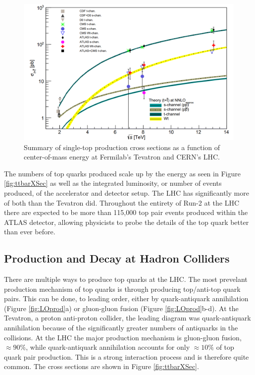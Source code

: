\begin{figure}[h!]
	\centering
	\includegraphics[width=\columnwidth]{../ThesisImages/Theory/singtprodxsec.png}
	\caption[Summary of single-top production cross sections as a function of center-of-mass energy at Fermilab's Tevatron and CERN's LHC.]{Summary of single-top production cross sections as a function of center-of-mass energy at Fermilab's Tevatron and CERN's LHC\cite{TopWG}.}
	\label{fig:singtXSec}
\end{figure}

 The numbers of top quarks produced scale up by the energy as seen in Figure \ref{fig:ttbarXSec} as well as the integrated luminosity, or number of events produced, of the accelerator and detector setup.  The LHC has significantly more of both than the Tevatron did.  Throughout the entirety of Run-2 at the LHC there are expected to be more than 115,000 top pair events produced within the ATLAS detector, allowing physicists to probe the details of the top quark better than ever before.  


\subsection{Production and Decay at Hadron Colliders}

There are multiple ways to produce top quarks at the LHC.  The most prevelant production mechanism of top quarks is through producing top/anti-top quark pairs.  This can be done, to leading order, either by quark-antiquark annihilation (Figure \ref{fig:LOprod}a) or gluon-gluon fusion (Figure \ref{fig:LOprod}b-d).  At the Tevatron, a proton anti-proton collider, the leading diagram was quark-antiquark annihilation because of the significantly greater numbers of antiquarks in the collisions.  At the LHC the major production mechanism is gluon-gluon fusion, $\approx 90\%$, while quark-antiquark annihilation accounts for only $\approx 10\%$  of top quark pair production.  This is a strong interaction process and is therefore quite common.  The cross sections are shown in Figure \ref{fig:ttbarXSec}.

